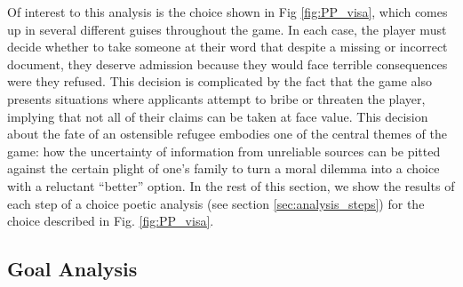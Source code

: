 \documentclass[arts,article,submit,moreauthors,pdftex,10pt,a4paper]{Definitions/mdpi}
\begin{document}
Of interest to this analysis is the choice shown in Fig \ref{fig:PP_visa}, which comes up in several different guises throughout the game.
%
In each case, the player must decide whether to take someone at their word that despite a missing or incorrect document, they deserve admission because they would face terrible consequences were they refused.
%
This decision is complicated by the fact that the game also presents situations where applicants attempt to bribe or threaten the player, implying that not all of their claims can be taken at face value.
%
This decision about the fate of an ostensible refugee embodies one of the central themes of the game: how the uncertainty of information from unreliable sources can be pitted against the certain plight of one's family to turn a moral dilemma into a choice with a reluctant ``better'' option.
%
In the rest of this section, we show the results of each step of a choice poetic analysis (see section \ref{sec:analysis_steps}) for the choice described in Fig. \ref{fig:PP_visa}.

\subsection{Goal Analysis}
\end{document}
